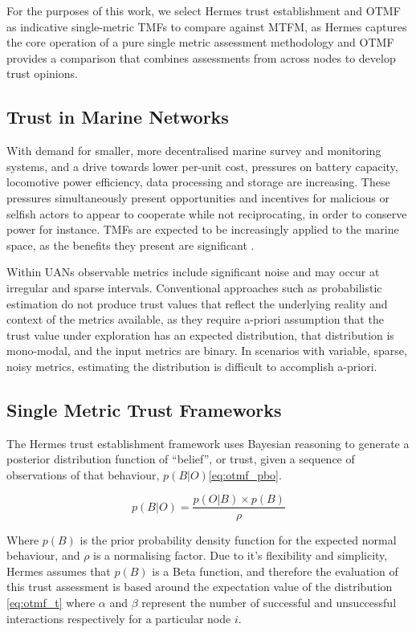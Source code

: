 \documentclass[conference]{IEEEtran}
\begin{document}
For the purposes of this work, we select Hermes trust establishment and OTMF as indicative single-metric TMFs to compare against MTFM, as Hermes captures the core operation of a pure single metric assessment methodology and OTMF provides a comparison that combines assessments from across nodes to develop trust opinions.


\subsection{Trust in Marine Networks}\label{sec:trust_in_marine}

With demand for smaller, more decentralised marine survey and monitoring systems, and a drive towards lower per-unit cost, pressures on battery capacity, locomotive power efficiency, data processing and storage are increasing.
These pressures simultaneously present opportunities and incentives for malicious or selfish actors to appear to cooperate while not reciprocating, in order to conserve power for instance.
TMFs are expected to be increasingly applied to the marine space, as the benefits they present are significant \cite{Pavan2015}.

Within UANs observable metrics include significant noise and may occur at irregular and sparse intervals.
Conventional approaches such as probabilistic estimation do not produce trust values that reflect the underlying reality and context of the metrics available, as they require a-priori assumption that the trust value under exploration has an expected distribution, that distribution is mono-modal, and the input metrics are binary.
In scenarios with variable, sparse, noisy metrics, estimating the distribution is difficult to accomplish a-priori.

\subsection{Single Metric Trust Frameworks}

The Hermes trust establishment framework \cite{Zouridaki2005} uses Bayesian reasoning to generate a posterior distribution function of ``belief'', or trust, given a sequence of observations of that behaviour, $p(B|O)$\eqref{eq:otmf_pbo}.

\begin{equation}
  p(B|O)  = \frac{p(O|B) \times p(B)}{\rho}
  \label{eq:otmf_pbo}
\end{equation}

Where $p(B)$ is the prior probability density function for the expected normal behaviour, and $\rho$ is a normalising factor.
Due to it's flexibility and simplicity, Hermes assumes that $p(B)$ is a Beta function, and therefore the evaluation of this trust assessment is based around the expectation value of the distribution \eqref{eq:otmf_t}  where $\alpha$ and $\beta$ represent the number of successful and unsuccessful interactions respectively for a particular node $i$.
\end{document}
